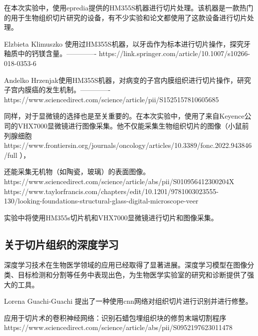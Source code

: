在本次实验中，使用epredia提供的HM355S机器进行切片处理。该机器是一款热门的用于生物组织切片研究的设备，有不少实验和论文都使用了这款设备进行切片处理。

Elzbieta Klimuszko 使用过HM355S机器，以牙齿作为标本进行切片操作，探究牙釉质中的钙镁含量。-------------
https://link.springer.com/article/10.1007/s10266-018-0353-6


Andelko Hrzenjak使用HM355S机器，对病变的子宫内膜组织进行切片操作，研究子宫内膜癌的发生机制。-------------
https://www.sciencedirect.com/science/article/pii/S1525157810605685

同样，对于显微镜的选择也是至关重要的。在本次实验中，使用了来自Keyence公司的VHX7000显微镜进行图像采集。他不仅能采集生物组织切片的图像（小鼠前列腺细胞
https://www.frontiersin.org/journals/oncology/articles/10.3389/fonc.2022.943846/full
），


还能采集无机物（如陶瓷，玻璃）的表面图像。
https://www.sciencedirect.com/science/article/abs/pii/S010956412300204X
https://www.taylorfrancis.com/chapters/edit/10.1201/9781003023555-130/looking-foundations-structural-glass-digital-microscope-veer

实验中将使用HM355s切片机和VHX7000显微镜进行切片和图像采集。





\subsection{关于切片组织的深度学习}


深度学习技术在生物医学领域的应用已经取得了显著进展。深度学习模型在图像分类、目标检测和分割等任务中表现出色，为生物医学实验室的研究和诊断提供了强大的工具。

Lorena Guachi-Guachi 提出了一种使用cnn网络对组织切片进行识别并进行修整。

应用于切片术的卷积神经网络：识别石蜡包埋组织块的修剪末端切割程序
https://www.sciencedirect.com/science/article/abs/pii/S0952197623011478


